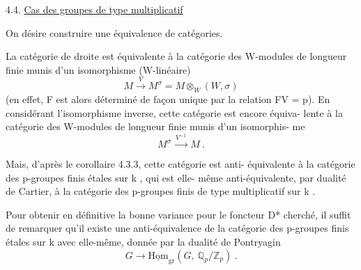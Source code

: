 
4.4. \uline{Cas des groupes de type multiplicatif}

On désire construire une équivalence de catégories.


La catégorie de droite est équivalente à la catégorie des
W-modules de longueur finie munis d'un isomorphisme (W-linéaire)
\[ M \xrightarrow{\ V\ } M^{\sigma} = M \otimes_{W} (W,\sigma) \]
(en effet, F est alors déterminé de façon unique par la relation FV = p).
En considérant l'isomorphisme inverse, cette catégorie est encore équiva-%
lente à la catégorie des W-modules de longueur finie munis d'un isomorphis-%
me
\[ M^{\sigma} \xrightarrow{\ V^{-1}\ } M \ . \]

Mais, d'après le corollaire 4.3.3, cette catégorie est anti-%
équivalente à la catégorie des p-groupes finis étales sur k , qui est elle-%
même anti-équivalente, par dualité de Cartier, à la catégorie des p-groupes
finis de type multiplicatif sur k .

Pour obtenir en définitive la bonne variance pour le foncteur
D* cherché, il suffit de remarquer qu'il existe une anti-équivalence de
la catégorie des p-groupes finis étales sur k avec elle-même, donnée par
la dualité de Pontryagin
\[ G \to \underline{\mathrm{Hom}}_{\mathrm{gr}}(G,\ \mathbb{Q}_{p}/\mathbb{Z}_{p}) \ . \]

